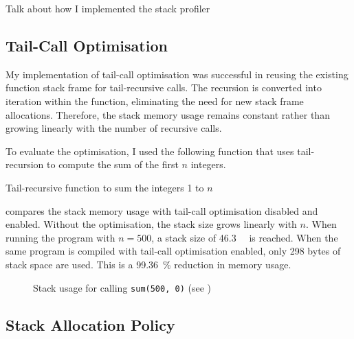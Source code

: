 \documentclass[00-main.tex]{subfiles}
\begin{document}
\begin{Comment}
Talk about how I implemented the stack profiler
\end{Comment}



\newcommand{\stackplot}[1]{\fbox{\resizebox{0.98\textwidth}{!}{}}}

\subsection{Tail-Call Optimisation}

My implementation of tail-call optimisation was successful in reusing the existing function stack frame for tail-recursive calls. The recursion is converted into iteration within the function, eliminating the need for new stack frame allocations.
Therefore, the stack memory usage remains constant rather than growing linearly with the number of recursive calls.

To evaluate the optimisation, I used the following function that uses tail-recursion to compute the sum of the first $n$ integers.

\begin{listing}[h]
  \caption{Tail-recursive function to sum the integers 1 to $n$}
  \label{lst:tail-recursive sum}
\end{listing}


 compares the stack memory usage with tail-call optimisation disabled and enabled.
Without the optimisation, the stack size grows linearly with $n$.
When running the program with $n=500$, a stack size of \SI{46.3}{\kilo\byte} is reached.
When the same program is compiled with tail-call optimisation enabled, only 298 bytes of stack space are used.
This is a \SI{99.36}{\percent} reduction in memory usage.

\begin{figure}[h]
  \centering
  \stackplot{22-tailcall-sum-compare-tailcallopt-without-stackopt.pgf}
  \caption{Stack usage for calling \texttt{sum(500, 0)} (see )}
  \label{fig:plot:tail-call optimisation stack use}
\end{figure}

\subsection{Stack Allocation Policy}
\end{document}
